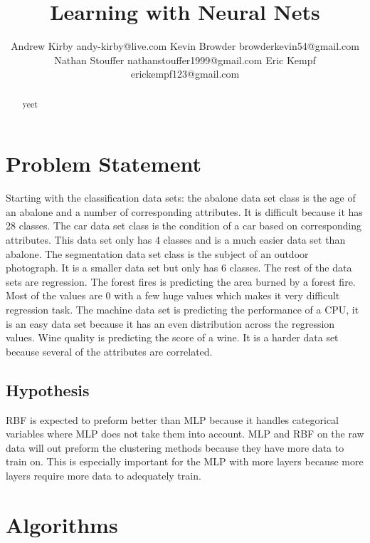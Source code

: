 \documentclass[twoside,11pt]{article}
\begin{document}
\title{Learning with Neural Nets}

\author{\name Andrew Kirby \email andy-kirby@live.com \AND
		\name Kevin Browder \email browderkevin54@gmail.com \AND
		\name Nathan Stouffer \email nathanstouffer1999@gmail.com \AND
		\name Eric Kempf \email erickempf123@gmail.com }

\maketitle

\begin{abstract}
yeet
\end{abstract}

\section{Problem Statement}
Starting with the classification data sets: the abalone data set class is the  age of an abalone and a number of corresponding attributes. It is difficult because it has 28 classes. The car data set class is the condition of a car based on corresponding attributes. This data set only has 4 classes and is a much easier data set than abalone. The segmentation data set class is the subject of an outdoor photograph. It is a smaller data set but only has 6 classes. The rest of the data sets are regression. The forest fires is predicting the area burned by a forest fire. Most of the values are 0 with a few huge values which makes it very difficult regression task. The machine data set is predicting the performance of a CPU, it is an easy data set because it has an even distribution across the regression values. Wine quality is predicting the score of a wine. It is a harder data set because several of the attributes are correlated.
	

\subsection*{Hypothesis}
RBF is expected to preform better than MLP because it handles categorical variables where MLP does not take them into account. MLP and RBF on the raw data will out preform the clustering methods because they have more data to train on. This is especially important for the MLP with more layers because more layers require more data to adequately train.
\section{Algorithms}
\end{document}
